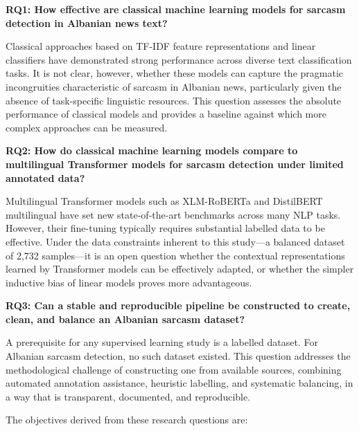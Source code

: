 \documentclass[12pt,a4paper]{article}
\begin{document}
\vspace{0.5em}
\noindent\textbf{RQ1: How effective are classical machine learning models for sarcasm detection in Albanian news text?}

Classical approaches based on TF-IDF feature representations and linear classifiers have demonstrated strong performance across diverse text classification tasks. It is not clear, however, whether these models can capture the pragmatic incongruities characteristic of sarcasm in Albanian news, particularly given the absence of task-specific linguistic resources. This question assesses the absolute performance of classical models and provides a baseline against which more complex approaches can be measured.

\vspace{0.5em}
\noindent\textbf{RQ2: How do classical machine learning models compare to multilingual Transformer models for sarcasm detection under limited annotated data?}

Multilingual Transformer models such as XLM-RoBERTa and DistilBERT multilingual have set new state-of-the-art benchmarks across many NLP tasks. However, their fine-tuning typically requires substantial labelled data to be effective. Under the data constraints inherent to this study---a balanced dataset of 2,732 samples---it is an open question whether the contextual representations learned by Transformer models can be effectively adapted, or whether the simpler inductive bias of linear models proves more advantageous.

\vspace{0.5em}
\noindent\textbf{RQ3: Can a stable and reproducible pipeline be constructed to create, clean, and balance an Albanian sarcasm dataset?}

A prerequisite for any supervised learning study is a labelled dataset. For Albanian sarcasm detection, no such dataset existed. This question addresses the methodological challenge of constructing one from available sources, combining automated annotation assistance, heuristic labelling, and systematic balancing, in a way that is transparent, documented, and reproducible.

\vspace{1em}
\noindent The objectives derived from these research questions are:
\end{document}
